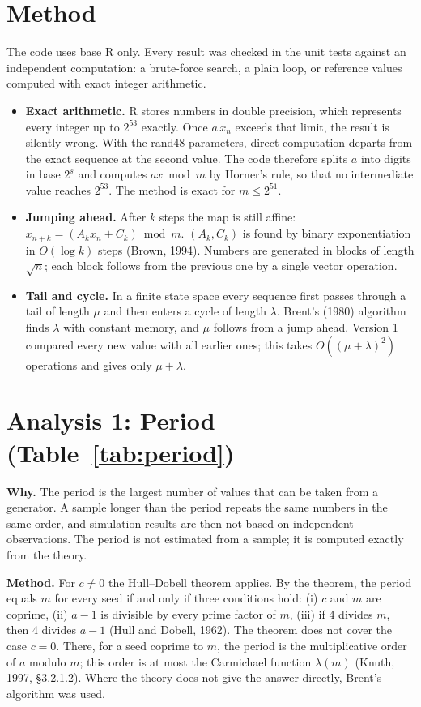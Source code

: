\documentclass[11pt,a4paper]{article}
\begin{document}
\section{Method}

The code uses base R only. Every result was checked in the unit tests against an independent computation: a brute-force
search, a plain loop, or reference values computed with exact integer arithmetic.

\begin{itemize}
  \item \textbf{Exact arithmetic.} R stores numbers in double precision, which represents every integer up to $2^{53}$
  exactly. Once $a\,x_n$ exceeds that limit, the result is silently wrong. With the rand48 parameters, direct computation
  departs from the exact sequence at the second value. The code therefore splits $a$ into digits in base $2^s$ and computes
  $a x \bmod m$ by Horner's rule, so that no intermediate value reaches $2^{53}$. The method is exact for $m \le 2^{51}$.
  \item \textbf{Jumping ahead.} After $k$ steps the map is still affine: $x_{n+k} = (A_k x_n + C_k) \bmod m$. $(A_k, C_k)$ is
  found by binary exponentiation in $O(\log k)$ steps (Brown, 1994). Numbers are generated in blocks of length $\sqrt{n}$;
  each block follows from the previous one by a single vector operation.
  \item \textbf{Tail and cycle.} In a finite state space every sequence first passes through a tail of length $\mu$ and then
  enters a cycle of length $\lambda$. Brent's (1980) algorithm finds $\lambda$ with constant memory, and $\mu$ follows from a
  jump ahead. Version 1 compared every new value with all earlier ones; this takes $O((\mu+\lambda)^2)$ operations and gives
  only $\mu+\lambda$.
\end{itemize}

\section{Analysis 1: Period (Table~\ref{tab:period})}

\textbf{Why.} The period is the largest number of values that can be taken from a generator. A sample longer than the period
repeats the same numbers in the same order, and simulation results are then not based on independent observations. The period
is not estimated from a sample; it is computed exactly from the theory.

\textbf{Method.} For $c \ne 0$ the Hull--Dobell theorem applies. By the theorem, the period equals $m$ for every seed if and
only if three conditions hold: (i) $c$ and $m$ are coprime, (ii) $a-1$ is divisible by every prime factor of $m$, (iii) if 4
divides $m$, then 4 divides $a-1$ (Hull and Dobell, 1962). The theorem does not cover the case $c=0$. There, for a seed coprime
to $m$, the period is the multiplicative order of $a$ modulo $m$; this order is at most the Carmichael function $\lambda(m)$
(Knuth, 1997, §3.2.1.2). Where the theory does not give the answer directly, Brent's algorithm was used.
\end{document}
